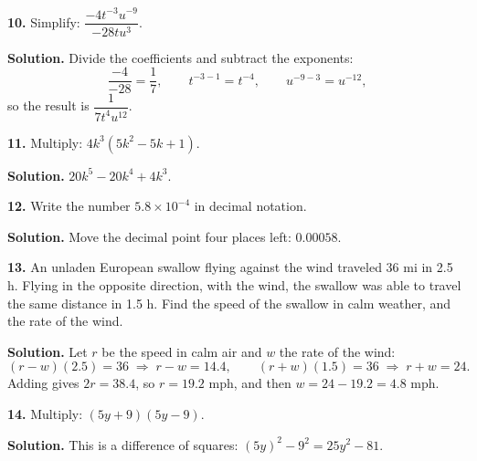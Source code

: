 \documentclass{ximera}
\begin{document}
\begin{problem}

\textbf{10.} Simplify: $\dfrac{-4t^{-3}u^{-9}}{-28tu^{3}}$.

\begin{hint}
\textbf{Solution.} Divide the coefficients and subtract the exponents:
\[
  \frac{-4}{-28}=\frac{1}{7}, \qquad t^{-3-1}=t^{-4}, \qquad u^{-9-3}=u^{-12},
\]
so the result is $\dfrac{1}{7t^{4}u^{12}}$.
\end{hint}
\end{problem}

\begin{problem}

\textbf{11.} Multiply: $4k^{3}\left(5k^{2}-5k+1\right)$.

\begin{hint}
\textbf{Solution.} $20k^{5}-20k^{4}+4k^{3}$.
\end{hint}
\end{problem}

\begin{problem}

\textbf{12.} Write the number $5.8\times 10^{-4}$ in decimal notation.

\begin{hint}
\textbf{Solution.} Move the decimal point four places left: $0.00058$.
\end{hint}
\end{problem}

\begin{problem}

\textbf{13.} An unladen European swallow flying against the wind traveled 36 mi in
2.5 h. Flying in the opposite direction, with the wind, the swallow was able to travel
the same distance in 1.5 h. Find the speed of the swallow in calm weather, and the rate
of the wind.

\begin{hint}
\textbf{Solution.} Let $r$ be the speed in calm air and $w$ the rate of the wind:
\[
  (r-w)(2.5)=36 \;\Longrightarrow\; r-w=14.4, \qquad
  (r+w)(1.5)=36 \;\Longrightarrow\; r+w=24 .
\]
Adding gives $2r=38.4$, so $r=19.2$ mph, and then $w=24-19.2=4.8$ mph.
\end{hint}
\end{problem}

\begin{problem}

\textbf{14.} Multiply: $(5y+9)(5y-9)$.

\begin{hint}
\textbf{Solution.} This is a difference of squares: $(5y)^{2}-9^{2}=25y^{2}-81$.
\end{hint}
\end{problem}
\end{document}
